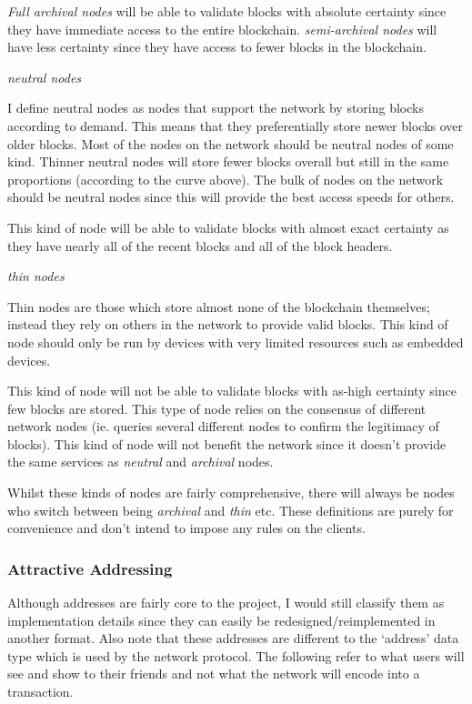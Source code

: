\documentclass{article}
\begin{document}
\textit{Full archival nodes} will be able to validate blocks with absolute certainty since they have immediate access to the entire blockchain. \textit{semi-archival nodes} will have less certainty since they have access to fewer blocks in the blockchain.

\begin{center}
    \Large{\textit{neutral nodes}}
\end{center}

I define neutral nodes as nodes that support the network by storing blocks according to demand. This means that they preferentially store newer blocks over older blocks. Most of the nodes on the network should be neutral nodes of some kind. Thinner neutral nodes will store fewer blocks overall but still in the same proportions (according to the curve above). The bulk of nodes on the network should be neutral nodes since this will provide the best access speeds for others.

This kind of node will be able to validate blocks with almost exact certainty as they have nearly all of the recent blocks and all of the block headers.

\begin{center}
    \Large{\textit{thin nodes}}
\end{center}

Thin nodes are those which store almost none of the blockchain themselves; instead they rely on others in the network to provide valid blocks. This kind of node should only be run by devices with very limited resources such as embedded devices.

This kind of node will not be able to validate blocks with as-high certainty since few blocks are stored. This type of node relies on the consensus of different network nodes (ie. queries several different nodes to confirm the legitimacy of blocks). This kind of node will not benefit the network since it doesn't provide the same services as \textit{neutral} and \textit{archival} nodes.

\vspace{1cm}
Whilst these kinds of nodes are fairly comprehensive, there will always be nodes who switch between being \textit{archival} and \textit{thin} etc. These definitions are purely for convenience and don't intend to impose any rules on the clients.

\normalsize

\subsubsection{Attractive Addressing}
Although addresses are fairly core to the project, I would still classify them as implementation details since they can easily be redesigned/reimplemented in another format. Also note that these addresses are different to the `address' data type which is used by the network protocol. The following refer to what users will see and show to their friends and not what the network will encode into a transaction.
\end{document}
